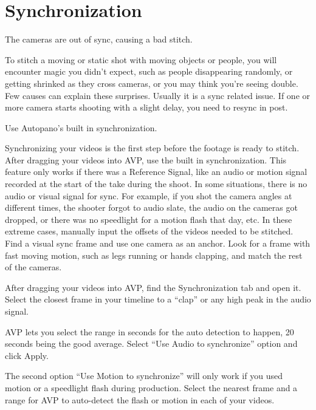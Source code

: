 \chapter{Synchronization}
\pagecolor{white}
\label{chap:33}
\begin{fullwidth}


\problem

{\large The cameras are out of sync, causing a bad stitch. \par}

To stitch a moving or static shot with moving objects or people, you will encounter magic you didn’t expect, such as people disappearing randomly, or getting shrinked as they cross cameras, or you may think you’re seeing double. Few causes can explain these surprises. Usually it is a sync related issue. If one or more camera starts shooting with a slight delay, you need to resync in post.


\solutions

{\large Use Autopano’s built in synchronization. \par}

Synchronizing your videos is the first step before the footage is ready to stitch. After dragging your videos into AVP, use the built in synchronization. This feature only works if there was a Reference Signal, like an audio or motion signal recorded at the start of the take during the shoot. In some situations, there is no audio or visual signal for sync. For example, if you shot the camera angles at different times, the shooter forgot to audio slate, the audio on the cameras got dropped, or there was no speedlight for a motion flash that day, etc. In these extreme cases, manually input the offsets of the videos needed to be stitched. Find a visual sync frame and use one camera as an anchor. Look for a frame with fast moving motion, such as legs running or hands clapping, and match the rest of the cameras.

After dragging your videos into AVP, find the Synchronization tab and open it. Select the closest frame in your timeline to a “clap” or any high peak in the audio signal. 

AVP lets you select the range in seconds for the auto detection to happen, 20 seconds being the good average. Select “Use Audio to synchronize” option and click Apply.


The second option “Use Motion to synchronize” will only work if you used motion or a speedlight flash during production. Select the nearest frame and a range for AVP to auto-detect the flash or motion in each of your videos.



\end{fullwidth}
